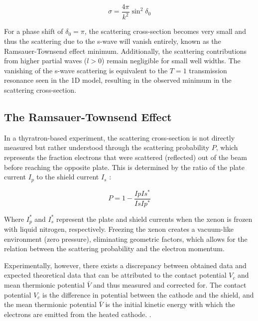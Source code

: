 \documentclass[11pt, a4paper, twocolumn]{article}
\begin{document}
\begin{equation*}
  \sigma = \frac{4\pi}{k^2}\sin^2\delta_0
\end{equation*}

For a phase shift of $\delta_0=\pi$, the scattering cross-section becomes very small and thus the scattering due to the s-wave will vanish entirely, known as the Ramsauer-Townsend effect minimum. Additionally, the scattering contributions from higher partial waves ($l>0$) remain negligible for small well widths. The vanishing of the s-wave scattering is equivalent to the $T=1$ transmission resonance seen in the 1D model, resulting in the observed minimum in the scattering cross-section. \cite{kukolich1968demonstration,o1963extrapolation}

\subsection{The Ramsauer-Townsend Effect}

In a thyratron-based experiment, the scattering cross-section is not directly measured but rather understood through the scattering probability $P$, which represents the fraction electrons that were scattered (reflected) out of the beam before reaching the opposite plate. This is determined by the ratio of the plate current $I_p$ to the shield current $I_s$ \cite{kukolich1968demonstration}:

\begin{equation} \label{eq:1}
  P = 1 - \frac{IpIs^*}{IsIp^*}
\end{equation}

Where $I_p^*$ and $I_s^*$ represent the plate and shield currents when the xenon is frozen with liquid nitrogen, respectively. Freezing the xenon creates a vacuum-like environment (zero pressure), eliminating geometric factors, which allows for the relation between the scattering probability and the electron momentum. \cite{kukolich1968demonstration,woolsey1971extension}

Experimentally, however, there exists a discrepancy between obtained data and expected theoretical data that can be attributed to the contact potential $V_c$ and mean thermionic potential $\bar{V}$ and thus measured and corrected for. The contact potential $V_c$ is the difference in potential between the cathode and the shield, and the mean thermionic potential $\bar{V}$ is the initial kinetic energy with which the electrons are emitted from the heated cathode. \cite{kukolich1968demonstration,woolsey1971extension}.
\end{document}
